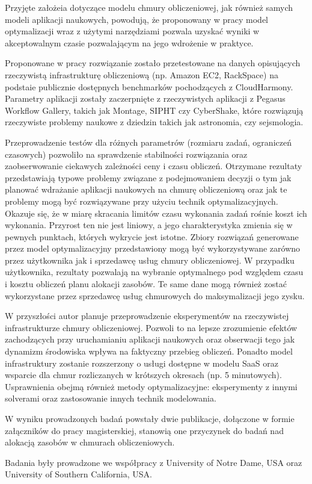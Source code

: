 \documentclass[11pt, a4paper]{article} %
\begin{document}
Przyjęte założeia dotyczące modelu chmury obliczeniowej, jak również samych modeli aplikacji naukowych, powodują, że proponowany w pracy model optymalizacji wraz z użytymi narzędziami pozwala uzyskać wyniki w akceptowalnym czasie pozwalającym na jego wdrożenie w praktyce.

Proponowane w pracy rozwiązanie zostało przetestowane na danych opisujących rzeczywistą infrastrukturę obliczeniową (np. Amazon EC2, RackSpace) na podstaie publicznie dostępnych benchmarków pochodzących z CloudHarmony. Parametry aplikacji zostały zaczerpnięte z rzeczywistych aplikacji z Pegasus Workflow Gallery, takich jak Montage, SIPHT czy CyberShake, które rozwiązują rzeczywiste problemy naukowe z dziedzin takich jak astronomia, czy sejsmologia.

Przeprowadzenie testów dla różnych parametrów (rozmiaru zadań, ograniczeń czasowych) pozwoliło na sprawdzenie stabilności rozwiązania oraz zaobserwowanie ciekawych zależności ceny i czasu obliczeń. Otrzymane rezultaty przedstawiają typowe problemy związane z podejmowaniem decyzji o tym jak planować wdrażanie aplikacji naukowych na chmurę obliczeniową oraz jak te problemy mogą być rozwiązywane przy użyciu technik optymalizacyjnych. Okazuje się, że w miarę skracania limitów czasu wykonania zadań rośnie koszt ich wykonania. Przyrost ten nie jest liniowy, a jego charakterystyka zmienia się w pewnych punktach, których wykrycie jest istotne. Zbiory rozwiązań generowane przez model optymalizacyjny przedstawiony mogą być wykorzystywane zarówno przez użytkownika jak i sprzedawcę usług chmury obliczeniowej. W przypadku użytkownika, rezultaty pozwalają na wybranie optymalnego pod względem czasu i kosztu obliczeń planu alokacji zasobów. Te same dane mogą również zostać wykorzystane przez sprzedawcę usług chmurowych do maksymalizacji jego zysku.

W przyszłości autor planuje przeprowadzenie eksperymentów na rzeczywistej infrastrukturze chmury obliczeniowej. Pozwoli to na lepsze zrozumienie efektów zachodzących przy uruchamianiu aplikacji naukowych oraz obserwacji tego jak dynamizm środowiska wpływa na faktyczny przebieg obliczeń. Ponadto model infrastruktury zostanie rozszerzony o usługi dostępne w modelu SaaS oraz wsparcie dla chmur rozliczanych w krótszych okresach (np. 5 minutowych). Usprawnienia obejmą również metody optymalizacyjne: eksperymenty z innymi solverami oraz zastosowanie innych technik modelowania.

W wyniku prowadzonych badań powstały dwie publikacje, dołączone w formie załączników do pracy magisterskiej, stanowią one przyczynek do badań nad alokacją zasobów w chmurach obliczeniowych.

Badania były prowadzone we współpracy z University of Notre Dame, USA oraz University of Southern California, USA.
\end{document}
